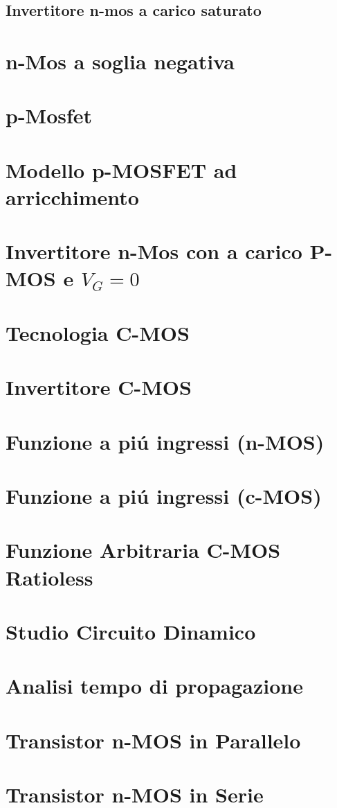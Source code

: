\documentclass{article}
\begin{document}
\subsection{Invertitore n-mos a carico saturato}
\section{n-Mos a soglia negativa}
\section{p-Mosfet}
\section{Modello p-MOSFET ad arricchimento}
\section{Invertitore n-Mos con a carico P-MOS e $V_G = 0$}
\section{Tecnologia C-MOS}
\section{Invertitore C-MOS}
\section{Funzione a pi\'u ingressi (n-MOS)}
\section{Funzione a pi\'u ingressi (c-MOS)}
\section{Funzione Arbitraria C-MOS Ratioless}
\section{Studio Circuito Dinamico}
\section{Analisi tempo di propagazione}
\section{Transistor n-MOS in Parallelo}
\section{Transistor n-MOS in Serie}
\end{document}
